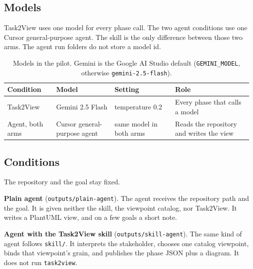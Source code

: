 \documentclass[11pt]{article}
\begin{document}
\subsection{Models}
Task2View uses one model for every phase call. The two agent conditions use one Cursor general-purpose agent. The skill is the only difference between those two arms. The agent run folders do not store a model id.

\begin{table}[h]
\centering
\small
\begin{tabularx}{\textwidth}{@{}YYYY@{}}
\toprule
Condition & Model & Setting & Role \\
\midrule
Task2View & Gemini 2.5 Flash & temperature 0.2 & Every phase that calls a model \\
Agent, both arms & Cursor general-purpose agent & same model in both arms & Reads the repository and writes the view \\
\bottomrule
\end{tabularx}
\caption{Models in the pilot. Gemini is the Google AI Studio default (\texttt{GEMINI\_MODEL}, otherwise \texttt{gemini-2.5-flash}).}
\label{tab:models}
\end{table}

\subsection{Conditions}
The repository and the goal stay fixed.

\noindent\textbf{Plain agent} (\texttt{outputs/plain-agent}).
The agent receives the repository path and the goal. It is given neither the skill, the viewpoint catalog, nor Task2View. It writes a PlantUML view, and on a few goals a short note.

\noindent\textbf{Agent with the Task2View skill} (\texttt{outputs/skill-agent}).
The same kind of agent follows \texttt{skill/}. It interprets the stakeholder, chooses one catalog viewpoint, binds that viewpoint's grain, and publishes the phase JSON plus a diagram. It does not run \texttt{task2view}.
\end{document}
